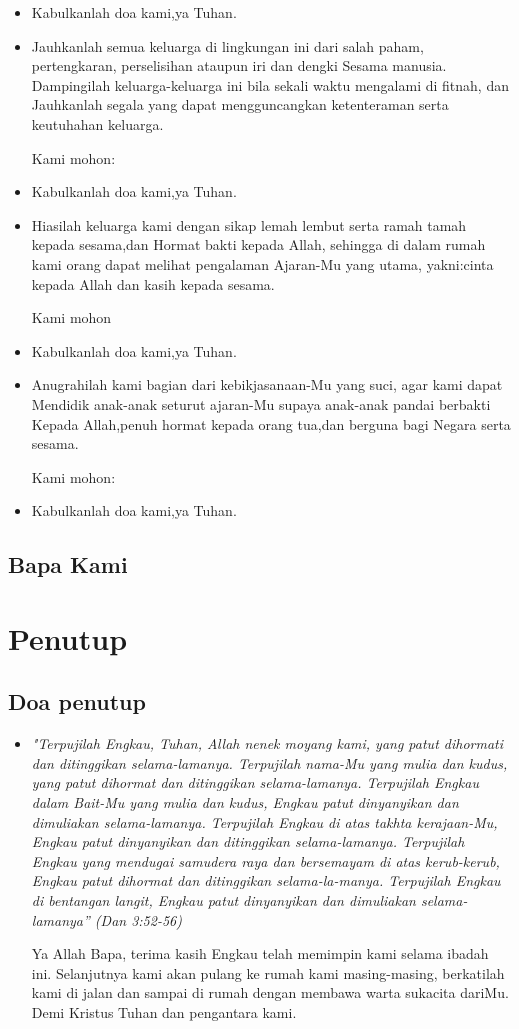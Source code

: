 \documentclass[a5paper,headsepline,titlepage,12pt,nnormalheadings,DIVcalc]{scrbook}
\newcommand{\BU}[1]{\begin{itemize} \item[U:] #1 \end{itemize}}
\newcommand{\BP}[1]{\begin{itemize} \item[P:] #1 \end{itemize}}
\begin{document}
\BU{Kabulkanlah doa kami,ya Tuhan.}

\BP{Jauhkanlah semua keluarga di lingkungan ini dari salah paham, pertengkaran, perselisihan ataupun iri dan dengki Sesama manusia. Dampingilah keluarga-keluarga ini bila sekali waktu mengalami di fitnah, dan Jauhkanlah segala yang dapat mengguncangkan ketenteraman serta keutuhahan keluarga. 

Kami mohon:}

\BU{Kabulkanlah doa kami,ya Tuhan.}

\BP{Hiasilah keluarga kami dengan sikap lemah lembut serta ramah tamah kepada sesama,dan Hormat bakti kepada Allah, sehingga di dalam rumah kami orang dapat melihat pengalaman Ajaran-Mu yang utama, yakni:cinta kepada Allah dan kasih kepada sesama. 

Kami mohon}

\BU{Kabulkanlah doa kami,ya Tuhan.}

\BP{Anugrahilah kami bagian dari kebikjasanaan-Mu yang suci, agar kami dapat Mendidik anak-anak seturut ajaran-Mu supaya anak-anak pandai berbakti Kepada Allah,penuh hormat kepada orang tua,dan berguna bagi Negara serta sesama. 

Kami mohon:}

\BU{Kabulkanlah doa kami,ya Tuhan.}


\subsection*{Bapa Kami}

\section*{Penutup}
\subsection*{Doa penutup}
\BP{\textit{"Terpujilah Engkau, Tuhan, Allah nenek moyang kami, yang patut dihormati dan ditinggikan selama-lamanya. Terpujilah nama-Mu yang mulia dan kudus, yang patut dihormat dan ditinggikan selama-lamanya. Terpujilah Engkau dalam Bait-Mu yang mulia dan kudus, Engkau patut dinyanyikan dan dimuliakan selama-lamanya. Terpujilah Engkau di atas takhta kerajaan-Mu, Engkau patut dinyanyikan dan ditinggikan selama-lamanya. Terpujilah Engkau yang mendugai samudera raya dan bersemayam di atas kerub-kerub, Engkau patut dihormat dan ditinggikan selama-la-manya. Terpujilah Engkau di bentangan langit, Engkau patut dinyanyikan dan dimuliakan selama-lamanya” (Dan 3:52-56)
}

Ya Allah Bapa, terima kasih Engkau telah memimpin kami selama ibadah ini. 
Selanjutnya kami akan pulang ke rumah kami masing-masing, berkatilah kami di jalan dan sampai di rumah dengan membawa warta sukacita dariMu. Demi Kristus Tuhan dan pengantara kami.}
\end{document}
